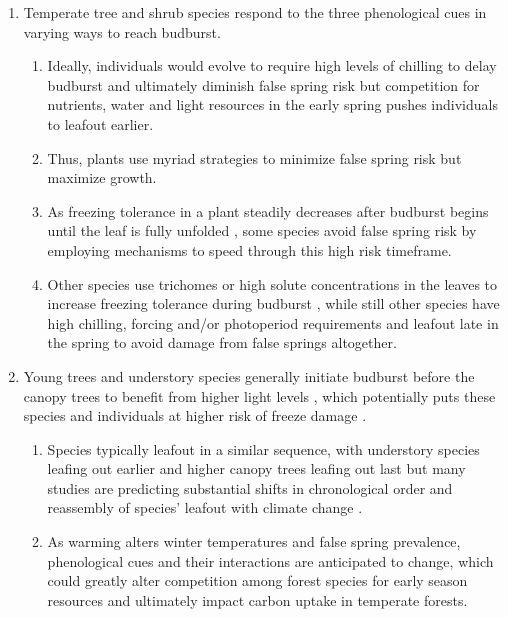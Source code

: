 \documentclass{article}\usepackage[]{graphicx}\usepackage[]{color}
\begin{document}
\begin{enumerate}
\item Temperate tree and shrub species respond to the three phenological cues in varying ways to reach budburst.
  \begin{enumerate} %
  \item Ideally, individuals would evolve to require high levels of chilling to delay budburst and ultimately diminish false spring risk but competition for nutrients, water and light resources in the early spring pushes individuals to leafout earlier.
  \item Thus, plants use myriad strategies to minimize false spring risk but maximize growth.
  \item As freezing tolerance in a plant steadily decreases after budburst begins until the leaf is fully unfolded \citep{Lenz2016}, some species avoid false spring risk by employing mechanisms to speed through this high risk timeframe.
  \item Other species use trichomes or high solute concentrations in the leaves to increase freezing tolerance during budburst \citep{Agrawal2004, Sakai1987}, while still other species have high chilling, forcing and/or photoperiod requirements and leafout late in the spring to avoid damage from false springs altogether.
  \end{enumerate}
  
\item Young trees and understory species generally initiate budburst before the canopy trees to benefit from higher light levels \citep {Augspurger2008, Vitasse2013}, which potentially puts these species and individuals at higher risk of freeze damage \citep{Vitasse2014}.
  \begin{enumerate}
  \item Species typically leafout in a similar sequence, with understory species leafing out earlier and higher canopy trees leafing out last but many studies are predicting substantial shifts in chronological order and reassembly of species' leafout with climate change \citep{Roberts2015, Laube2014}.
  \item As warming alters winter temperatures and false spring prevalence, phenological cues and their interactions are anticipated to change, which could greatly alter competition among forest species for early season resources and ultimately impact carbon uptake in temperate forests.
  \end{enumerate}
  

\end{enumerate}
\end{document}
